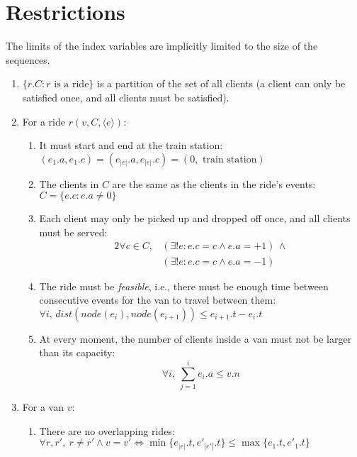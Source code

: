 \section{Restrictions}
The limits of the index variables are implicitly limited to the size of the sequences.
\begin{enumerate}
    \item $\{r.C : r \text{ is a ride}\}$ is a partition of the set of all clients (a client can only be satisfied once, and all clients must be satisfied).
    \item For a ride $r(v,C,\langle e \rangle)$:
    \begin{enumerate}
        \item It must start and end at the train station: $(e_1.a, e_1.c) = (e_{|e|}.a,e_{|e|}.c)=(0, \text{ train station})$
        \item The clients in $C$ are the same as the clients in the ride's events: $C=\{e.c : e.a \neq 0\}$
        \item Each client may only be picked up and dropped off once, and all clients must be served:
        \begin{alignat*}{2}
            \forall c \in C,
            &(\exists !e: e.c = c \wedge e.a = +1)\,\wedge \\
            &(\exists !e: e.c = c \wedge e.a = -1)
        \end{alignat*}
        \item The ride must be \emph{feasible}, i.e., there must be enough time between consecutive events for the van to travel between them: $\forall i,\,dist(node(e_i), node(e_{i+1})) \leq e_{i+1}.t - e_i.t$
        \item At every moment, the number of clients inside a van must not be larger than its capacity:
        \begin{equation*}
            \forall i,~\sum_{j=1}^{i}{e_i.a} \leq v.n
        \end{equation*}
    \end{enumerate}
    \item For a van $v$:
    \begin{enumerate}
        \item There are no overlapping rides: $\forall r, r',~r \neq r' \wedge v = v' \iff \min\{e_{|e|}.t,e'_{|e'|}.t\} \leq \max\{e_1.t,e'_1.t\}$
    \end{enumerate}
\end{enumerate}
